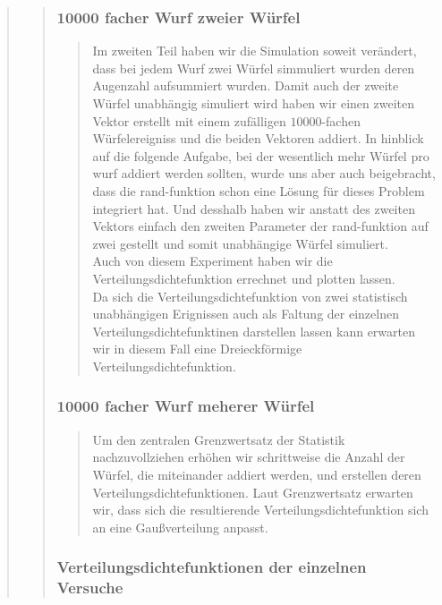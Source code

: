 \begin{quote}
\begin{quote}
\begin{quote}
		\end{quote}
        
        \subsubsection{10000 facher Wurf zweier Würfel}
		\begin{quote}
			Im zweiten Teil haben wir die Simulation soweit verändert, dass bei jedem Wurf zwei Würfel simmuliert wurden deren
			Augenzahl aufsummiert wurden. Damit auch der zweite Würfel unabhängig simuliert wird haben wir einen zweiten Vektor
			erstellt mit einem zufälligen $10000$-fachen Würfelereigniss und die beiden Vektoren addiert. In hinblick auf die
			folgende Aufgabe, bei der wesentlich mehr Würfel pro wurf addiert werden sollten, wurde uns aber auch beigebracht,
			dass die rand-funktion schon eine Lösung für dieses Problem integriert hat. Und desshalb haben wir anstatt des
			zweiten Vektors einfach den zweiten Parameter der rand-funktion auf zwei gestellt und somit unabhängige Würfel
			simuliert.\\
			Auch von diesem Experiment haben wir die Verteilungsdichtefunktion errechnet und plotten lassen.\\
			Da sich die Verteilungsdichtefunktion von zwei statistisch unabhängigen Erignissen auch als Faltung der einzelnen
			Verteilungsdichtefunktinen darstellen lassen kann erwarten wir in diesem Fall eine Dreieckförmige
			Verteilungsdichtefunktion.
		\end{quote}
        
        \subsubsection{10000 facher Wurf meherer Würfel}
		\begin{quote}
			Um den zentralen Grenzwertsatz der Statistik nachzuvollziehen erhöhen wir schrittweise die Anzahl der Würfel, die
			miteinander addiert werden, und erstellen deren Verteilungsdichtefunktionen. Laut Grenzwertsatz erwarten wir, dass
			sich die resultierende Verteilungsdichtefunktion sich an eine Gaußverteilung anpasst.
		\end{quote}
		
		\subsubsection{Verteilungsdichtefunktionen der einzelnen Versuche}
		\begin{quote}

\end{quote}
\end{quote}
\end{quote}
